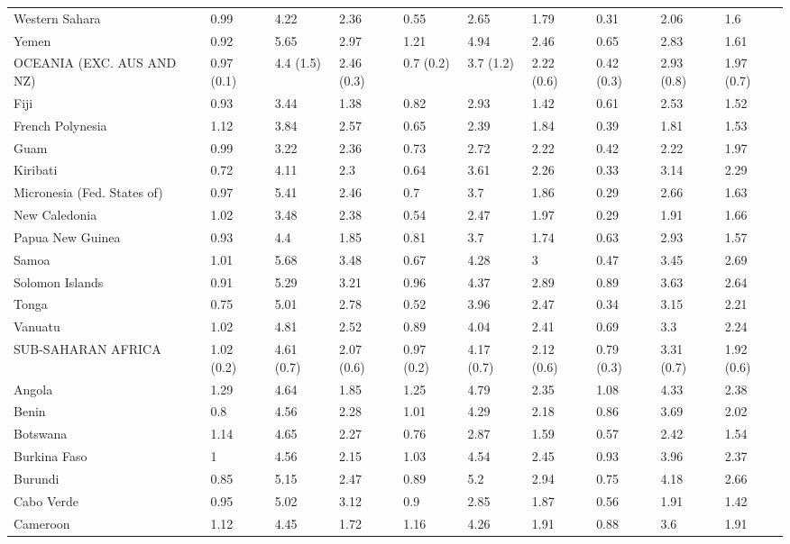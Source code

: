 \begin{longtable}[t]{llllllllll}
Western Sahara & 0.99 & 4.22 & 2.36 & 0.55 & 2.65 & 1.79 & 0.31 & 2.06 & 1.6\\
Yemen & 0.92 & 5.65 & 2.97 & 1.21 & 4.94 & 2.46 & 0.65 & 2.83 & 1.61\\
OCEANIA (EXC. AUS AND NZ) & 0.97 (0.1) & 4.4 (1.5) & 2.46 (0.3) & 0.7 (0.2) & 3.7 (1.2) & 2.22 (0.6) & 0.42 (0.3) & 2.93 (0.8) & 1.97 (0.7)\\
Fiji & 0.93 & 3.44 & 1.38 & 0.82 & 2.93 & 1.42 & 0.61 & 2.53 & 1.52\\
French Polynesia & 1.12 & 3.84 & 2.57 & 0.65 & 2.39 & 1.84 & 0.39 & 1.81 & 1.53\\
Guam & 0.99 & 3.22 & 2.36 & 0.73 & 2.72 & 2.22 & 0.42 & 2.22 & 1.97\\
Kiribati & 0.72 & 4.11 & 2.3 & 0.64 & 3.61 & 2.26 & 0.33 & 3.14 & 2.29\\
Micronesia (Fed. States of) & 0.97 & 5.41 & 2.46 & 0.7 & 3.7 & 1.86 & 0.29 & 2.66 & 1.63\\
New Caledonia & 1.02 & 3.48 & 2.38 & 0.54 & 2.47 & 1.97 & 0.29 & 1.91 & 1.66\\
Papua New Guinea & 0.93 & 4.4 & 1.85 & 0.81 & 3.7 & 1.74 & 0.63 & 2.93 & 1.57\\
Samoa & 1.01 & 5.68 & 3.48 & 0.67 & 4.28 & 3 & 0.47 & 3.45 & 2.69\\
Solomon Islands & 0.91 & 5.29 & 3.21 & 0.96 & 4.37 & 2.89 & 0.89 & 3.63 & 2.64\\
Tonga & 0.75 & 5.01 & 2.78 & 0.52 & 3.96 & 2.47 & 0.34 & 3.15 & 2.21\\
Vanuatu & 1.02 & 4.81 & 2.52 & 0.89 & 4.04 & 2.41 & 0.69 & 3.3 & 2.24\\
SUB-SAHARAN AFRICA & 1.02 (0.2) & 4.61 (0.7) & 2.07 (0.6) & 0.97 (0.2) & 4.17 (0.7) & 2.12 (0.6) & 0.79 (0.3) & 3.31 (0.7) & 1.92 (0.6)\\
Angola & 1.29 & 4.64 & 1.85 & 1.25 & 4.79 & 2.35 & 1.08 & 4.33 & 2.38\\
Benin & 0.8 & 4.56 & 2.28 & 1.01 & 4.29 & 2.18 & 0.86 & 3.69 & 2.02\\
Botswana & 1.14 & 4.65 & 2.27 & 0.76 & 2.87 & 1.59 & 0.57 & 2.42 & 1.54\\
Burkina Faso & 1 & 4.56 & 2.15 & 1.03 & 4.54 & 2.45 & 0.93 & 3.96 & 2.37\\
Burundi & 0.85 & 5.15 & 2.47 & 0.89 & 5.2 & 2.94 & 0.75 & 4.18 & 2.66\\
Cabo Verde & 0.95 & 5.02 & 3.12 & 0.9 & 2.85 & 1.87 & 0.56 & 1.91 & 1.42\\
Cameroon & 1.12 & 4.45 & 1.72 & 1.16 & 4.26 & 1.91 & 0.88 & 3.6 & 1.91\\

\end{longtable}
